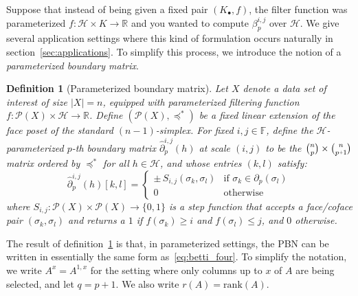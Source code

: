 \documentclass[10pt]{article}
\newcommand{\+}{%
	\raisebox{0.18ex}{\scaleobj{0.55}{+}}
}
\newtheorem{definition}{Definition}
\begin{document}
Suppose that instead of being given a fixed pair $(K_\bullet, f)$, the filter function was parameterized $f : \mathcal{H} \times K \to \mathbb{R}$ and you wanted to compute $\beta_p^{i,j}$ over $\mathcal{H}$. We give several application settings where this kind of formulation occurs naturally in section~\ref{sec:applications}. To simplify this process, we introduce the notion of a \emph{parameterized boundary matrix}.
\begin{definition}[Parameterized boundary matrix]\label{def:time_boundary_matrix}
Let $X$ denote a data set of interest of size $\lvert X \rvert = n$, equipped with parameterized filtering function $f : \mathcal{P}(X) \times \mathcal{H} \to \mathbb{R}$. 
Define $(\mathcal{P}(X), \preceq^\ast)$ be a fixed linear extension of the face poset of the standard $(n- 1)$-simplex. For fixed $i,j \in \mathbb{F}$, define the $\mathcal{H}$-\emph{parameterized} $p$\emph{-th boundary matrix} $\hat{\partial}_p^{i, j}(h)$ \emph{at scale} $(i,j)$ to be the $\binom{n}{p} \times \binom{n}{p\+1}$ matrix ordered by $\preceq^\ast$ for all $h \in \mathcal{H}$, and whose entries $(k,l)$ satisfy:
\begin{equation}
	\hat{\partial}_p^{i,j}(h)[k,l] = \begin{cases}
	\pm \, S_{i,j}(\sigma_k, \sigma_l) & \text{if } \sigma_k \in \partial_p(\sigma_l) \\
	0 & \text{otherwise}
\end{cases}
\end{equation}
where $S_{i, j} : \mathcal{P}(X) \times \mathcal{P}(X) \to \{0, 1\}$ is a \emph{step} function that accepts a face/coface pair $(\sigma_k, \sigma_l)$ and returns a $1$ if $f(\sigma_k) \geq i$ and $f(\sigma_l) \leq j$, and $0$ otherwise.
\end{definition}
\noindent
The result of definition~\ref{def:time_boundary_matrix} is that, in parameterized settings, the PBN can be written in essentially the same form as~\eqref{eq:betti_four}. To simplify the notation, we write $A^{x} = A^{1,x}$ for the setting where only columns up to $x$ of $A$ are being selected, and let $q = p + 1$. We also write $r(A) = \mathrm{rank}(A)$. 
\end{document}
